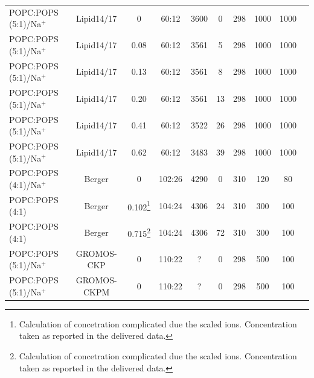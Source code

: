 \documentclass[aps,prl,superscriptaddress,twocolumn]{revtex4}
\begin{document}
\begin{table}[tb]
\begin{tabular}{l c c c c c c c c c }
    POPC:POPS (5:1)/Na$^+$ & Lipid14/17 \cite{dickson14,gould18}  & 0      & 60:12 & 3600  & 0   & 298  & 1000  & 1000  & \cite{lipid17_cacl_series}   \\
    POPC:POPS (5:1)/Na$^+$ & Lipid14/17 \cite{dickson14,gould18,smith94,dang06}  & 0.08   & 60:12 & 3561  & 5   & 298  & 1000  & 1000  & \cite{lipid17_cacl_series}   \\
    POPC:POPS (5:1)/Na$^+$ & Lipid14/17 \cite{dickson14,gould18,smith94,dang06}  & 0.13   & 60:12 & 3561  & 8   & 298  & 1000  & 1000  & \cite{lipid17_cacl_series}   \\
    POPC:POPS (5:1)/Na$^+$ & Lipid14/17 \cite{dickson14,gould18,smith94,dang06}  & 0.20   & 60:12 & 3561  & 13  & 298  & 1000  & 1000  & \cite{lipid17_cacl_series}   \\
    POPC:POPS (5:1)/Na$^+$ & Lipid14/17 \cite{dickson14,gould18,smith94,dang06}  & 0.41   & 60:12 & 3522  & 26  & 298  & 1000  & 1000  & \cite{lipid17_cacl_series}   \\
    POPC:POPS (5:1)/Na$^+$ & Lipid14/17 \cite{dickson14,gould18,smith94,dang06}  & 0.62   & 60:12 & 3483  & 39  & 298  & 1000  & 1000  & \cite{lipid17_cacl_series}   \\
    \hline
    POPC:POPS (4:1)/Na$^+$  & Berger \cite{tieleman99,mukhopadhyay04}  & 0   & 102:26 & 4290 & 0   & 310  & 120 & 80 & \cite{bergerPOPSPOPC4:1mixtureT310K}  \\
    POPC:POPS (4:1)  & Berger \cite{tieleman99,mukhopadhyay04}         & 0.102\footnote{Calculation of concetration complicated due the scaled ions. Concentration taken as reported in the delivered data.}   & 104:24 & 4306 & 24 & 310  & 300 & 100 & \cite{POPCpopsBERGERwith102mMCa}  \\
    POPC:POPS (4:1)  & Berger \cite{tieleman99,mukhopadhyay04}         & 0.715\footnote{Calculation of concetration complicated due the scaled ions. Concentration taken as reported in the delivered data.}  & 104:24 & 4306 & 72 & 310  & 300 & 100 & \cite{POPCpopsBERGERwith715mMCa}  \\
    \hline
    POPC:POPS (5:1)/Na$^+$  & GROMOS-CKP \cite{??}             & 0     & 110:22 & ?     & 0  & 298  & 500 & 100 & \cite{POPCpopsGROMOSCKPwithNa}  \\
    POPC:POPS (5:1)/Na$^+$  & GROMOS-CKPM \cite{??}            & 0     & 110:22 & ?     & 0  & 298  & 500 & 100 & \cite{POPCpopsGROMOSCKPMwithNa}  \\
\end{tabular}

\end{table}
\end{document}
